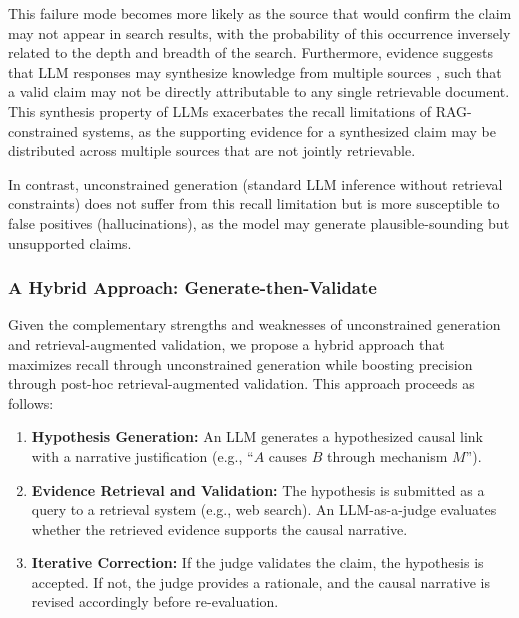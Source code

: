 This failure mode becomes more likely as the source that would confirm the claim may not appear in search results, with the probability of this occurrence inversely related to the depth and breadth of the search. Furthermore, evidence suggests that LLM responses may synthesize knowledge from multiple sources \citep{wang2023source,park2024identifyingsourcegenerationlarge}, such that a valid claim may not be directly attributable to any single retrievable document. This synthesis property of LLMs exacerbates the recall limitations of RAG-constrained systems, as the supporting evidence for a synthesized claim may be distributed across multiple sources that are not jointly retrievable.

In contrast, unconstrained generation (standard LLM inference without retrieval constraints) does not suffer from this recall limitation but is more susceptible to false positives (hallucinations), as the model may generate plausible-sounding but unsupported claims.

\subsubsection{A Hybrid Approach: Generate-then-Validate}

Given the complementary strengths and weaknesses of unconstrained generation and retrieval-augmented validation, we propose a hybrid approach that maximizes recall through unconstrained generation while boosting precision through post-hoc retrieval-augmented validation. This approach proceeds as follows:

\begin{enumerate}
    \item \textbf{Hypothesis Generation:} An LLM generates a hypothesized causal link with a narrative justification (e.g., ``$A$ causes $B$ through mechanism $M$'').
    
    \item \textbf{Evidence Retrieval and Validation:} The hypothesis is submitted as a query to a retrieval system (e.g., web search). An LLM-as-a-judge evaluates whether the retrieved evidence supports the causal narrative.
    
    \item \textbf{Iterative Correction:} If the judge validates the claim, the hypothesis is accepted. If not, the judge provides a rationale, and the causal narrative is revised accordingly before re-evaluation.
\end{enumerate}

